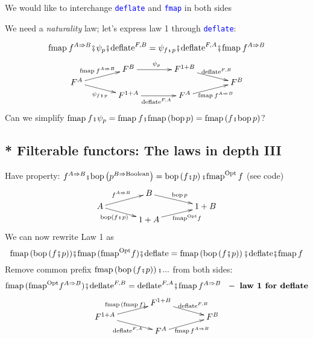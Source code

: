 We would like to interchange \texttt{\textcolor{blue}{\footnotesize{}deflate}}
and \texttt{\textcolor{blue}{\footnotesize{}fmap}} in both sides

We need a \emph{naturality} law; let's express law 1 through \texttt{\textcolor{blue}{\footnotesize{}deflate}}:

{\footnotesize{}
\[
\text{fmap}\:f^{A\Rightarrow B}\bef\psi_{p}\bef\text{deflate}^{F,B}=\psi_{f\bef p}\bef\text{deflate}^{F,A}\bef\text{fmap}\:f^{A\Rightarrow B}
\]
\[
\xymatrix{\xyScaleY{0.1pc}\xyScaleX{3pc} & F^{B}\ar[r]\sp(0.5){\psi_{p}} & F^{1+B}\ar[rd]\sp(0.5){\text{ deflate}^{F,B}}\\
F^{A}\ar[ru]\sp(0.5){\text{fmap}\:f^{A\Rightarrow B}}\ar[rd]\sb(0.5){\psi_{f\bef p}} &  &  & F^{B}\\
 & F^{1+A}\ar[r]\sb(0.5){\text{deflate}^{F,A}} & F^{A}\ar[ru]\sb(0.5){\text{fmap}\:f^{A\Rightarrow B}}
}
\]
Can we simplify $\text{fmap}\:f\bef\psi_{p}=\text{fmap}\:f\bef\text{fmap}\left(\text{bop}\,p\right)=\text{fmap}\left(f\bef\text{bop}\,p\right)$?}{\footnotesize\par}


\subsection{{*} Filterable functors: The laws in depth III}

{\footnotesize{}Have property: $f^{A\Rightarrow B}\bef\text{bop}\left(p^{B\Rightarrow\text{Boolean}}\right)=\text{bop}\left(f\bef p\right)\bef\text{fmap}^{\text{Opt}}\,f$
(see code)
\[
\xymatrix{\xyScaleY{0.2pc}\xyScaleX{3pc} & B\ar[rd]\sp(0.5){\text{bop}\,p}\\
A\ar[ru]\sp(0.5){f^{A\Rightarrow B}}\ar[rd]\sb(0.4){\text{bop}\left(f\bef p\right)\,} &  & 1+B\\
 & 1+A\ar[ru]\sb(0.6){\text{fmap}^{\text{Opt}}f}
}
\]
We can now rewrite Law 1 as
\[
\text{fmap}\,(\text{bop}\left(f\bef p\right))\bef\text{fmap}\,(\text{fmap}^{\text{Opt}}f)\bef\text{deflate}=\text{fmap}\left(\text{bop}\left(f\bef p\right)\right)\bef\text{deflate}\bef\text{fmap}\,f
\]
Remove common prefix $\text{fmap}\left(\text{bop}\left(f\bef p\right)\right)\bef...$
from both sides:
\[
\text{fmap}\,(\text{fmap}^{\text{Opt}}f^{A\Rightarrow B})\bef\text{deflate}^{F,B}=\text{deflate}^{F,A}\bef\text{fmap}\,f^{A\Rightarrow B}\ \ -\text{ \textbf{law 1 for deflate}}
\]
\[
\xymatrix{\xyScaleY{0.2pc}\xyScaleX{3pc} & F^{1+B}\ar[rd]\sp(0.5){\ \text{deflate}^{F,B}}\\
F^{1+A}\ar[ru]\sp(0.5){\text{fmap}\,(\text{fmap}\,f)\ }\ar[rd]\sb(0.5){\text{deflate}^{F,A}\,} &  & F^{B}\\
 & F^{A}\ar[ru]\sb(0.5){\text{fmap\,}f^{A\Rightarrow B}}
}
\]
}{\footnotesize\par}

